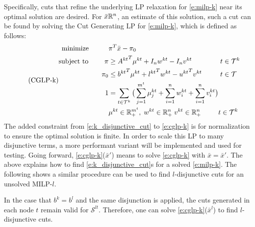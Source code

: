 \documentclass[10pt]{article}
\begin{document}
	Specifically, cuts that refine the underlying LP relaxation for \ref{e:milp-k} near its optimal solution are desired. For $ \bar{x} \mathbb{R}^n $, an estimate of this solution, such a cut can be found by solving the Cut Generating LP for \ref{e:milp-k}, which is defined as follows:
	\begin{equation} \tag{CGLP-k}
		\begin{alignedat}{2} \label{e:cglp-k} 
			\text{minimize } \; \; \qquad & \pi^T \bar{x} - \pi_0 && \\
			\text{subject to } \qquad \pi & \geq {A^{kt}}^T \mu^{kt} + I_n w^{kt} - I_n v^{kt} && \;  t \in \mathcal{T}^k \\
			\pi_0 & \leq {b^{kt}}^T \mu^{kt} + {l^{kt}}^T w^{kt} - {u^{kt}}^T v^{kt} && \; t \in \mathcal{T} \\
			1 & = \sum_{t \in \mathcal{T}^k} \big( \sum_{j=1}^{m^t} \mu_j^{kt} + \sum_{i=1}^{n} w_i^{kt} + \sum_{i=1}^{n} v_i^{kt} \big) && \\
			& \mu^{kt} \in \mathbb{R}_+^{m^t}, \; w^{kt} \in \mathbb{R}_+^n \; v^{kt} \in \mathbb{R}_+^n && t \in \mathcal{T}^k
		\end{alignedat}
	\end{equation}
	The added constraint from \ref{e:k_disjunctive_cut} to \ref{e:cglp-k} is for normalization to ensure the optimal solution is finite. In order to scale this LP to many disjunctive terms, a more performant variant \cite{aleks} will be implemented and used for testing. Going forward, \ref{e:cglp-k}($\bar{x}'$) means to solve \ref{e:cglp-k} with $ \bar{x} = \bar{x}' $. The above explains how to find \ref{e:k_disjunctive_cut}s for a solved \ref{e:milp-k}. The following shows a similar procedure can be used to find $ l $-disjunctive cuts for an unsolved MILP-$ l $.
	
	In the case that $ b^k = b^l $ and the same disjunction is applied, the cuts generated in each node $ t $ remain valid for $ \mathcal{S}^{lt} $. Therefore, one can solve \ref{e:cglp-k}($ \bar{x}^l $) to find $ l $-disjunctive cuts.
	
\end{document}
